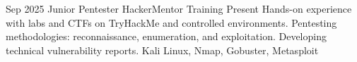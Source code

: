 
\begin{experiences}
  \experience
    {Sep 2025}                                %
    {Junior Pentester}                        %
    {HackerMentor}                            %
    {Training}                                %
    {Present}                                 %
    {                                         %
      Hands-on experience with labs and CTFs on TryHackMe and controlled environments.
      Pentesting methodologies: reconnaissance, enumeration, and exploitation.
      Developing technical vulnerability reports.
    }
    {Kali Linux, Nmap, Gobuster, Metasploit}  %
\end{experiences}